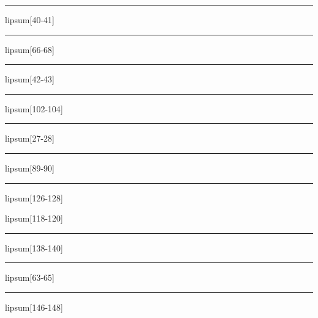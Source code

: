 \documentclass[11pt,a4paper]{article}
\begin{document}
\begin{simplewrap}
  \textcolor{blue!58}{\rule{3.1cm}{4.0cm}}
\end{simplewrap}
lipsum[40-41]

\begin{simplewrap}
  \textcolor{red!52}{\rule{3.3cm}{9.6cm}}
\end{simplewrap}
lipsum[66-68]

\begin{simplewrap}
  \textcolor{cyan!48}{\rule{4.8cm}{8.0cm}}
\end{simplewrap}
lipsum[42-43]

\begin{simplewrap}
  \textcolor{orange!47}{\rule{3.1cm}{4.5cm}}
\end{simplewrap}
lipsum[102-104]

\begin{simplewrap}
  \textcolor{yellow!14}{\rule{4.8cm}{8.6cm}}
\end{simplewrap}
lipsum[27-28]

\begin{simplewrap}
  \textcolor{violet!53}{\rule{4.8cm}{3.0cm}}
\end{simplewrap}
lipsum[89-90]

\begin{simplewrap}
  \textcolor{lime!14}{\rule{4.5cm}{4.7cm}}
\end{simplewrap}
lipsum[126-128]

lipsum[118-120]

\begin{simplewrap}
  \textcolor{purple!37}{\rule{3.5cm}{6.2cm}}
\end{simplewrap}
lipsum[138-140]

\begin{simplewrap}
  \textcolor{blue!37}{\rule{5.5cm}{6.7cm}}
\end{simplewrap}
lipsum[63-65]

\begin{simplewrap}
  \textcolor{green!27}{\rule{5.6cm}{4.0cm}}
\end{simplewrap}
lipsum[146-148]
\end{document}
